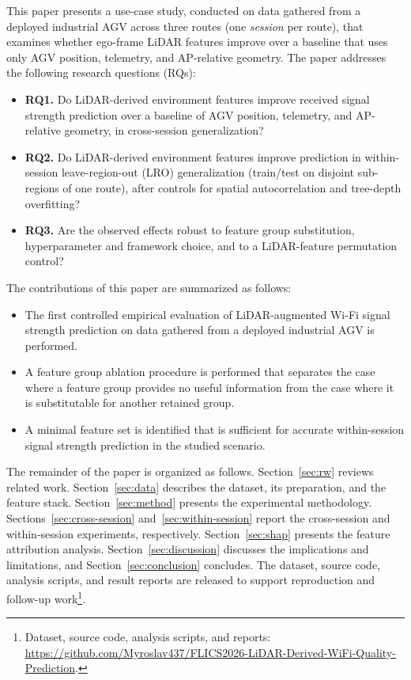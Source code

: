 \documentclass[conference]{IEEEtran}
\begin{document}
This paper presents a use-case study, conducted on data gathered from a deployed industrial AGV across three routes (one \emph{session} per route), that examines whether ego-frame LiDAR features improve over a baseline that uses only AGV position, telemetry, and AP-relative geometry. 
The paper addresses the following research questions (RQs):
\begin{itemize}
    \item \textbf{RQ1.} Do LiDAR-derived environment features improve received signal strength prediction over a baseline of AGV position, telemetry, and AP-relative geometry, in cross-session generalization?
    \item \textbf{RQ2.} Do LiDAR-derived environment features improve prediction in within-session leave-region-out (LRO) generalization (train/test on disjoint sub-regions of one route), after controls for spatial autocorrelation and tree-depth overfitting?
    \item \textbf{RQ3.} Are the observed effects robust to feature group substitution, hyperparameter and framework choice, and to a LiDAR-feature permutation control?
\end{itemize}
 
The contributions of this paper are summarized as follows:
\begin{itemize}
    \item The first controlled empirical evaluation of LiDAR-augmented Wi\nobreakdash-Fi signal strength prediction on data gathered from a deployed industrial AGV is performed.
    \item A feature group ablation procedure is performed that separates the case where a feature group provides no useful information from the case where it is substitutable for another retained group.
    \item A minimal feature set is identified that is sufficient for accurate within-session signal strength prediction in the studied scenario.
\end{itemize}
 
The remainder of the paper is organized as follows. Section~\ref{sec:rw} reviews related work. Section~\ref{sec:data} describes the dataset, its preparation, and the feature stack. Section~\ref{sec:method} presents the experimental methodology. Sections~\ref{sec:cross-session} and~\ref{sec:within-session} report the cross-session and within-session experiments, respectively. Section~\ref{sec:shap} presents the feature attribution analysis. Section~\ref{sec:discussion} discusses the implications and limitations, and Section~\ref{sec:conclusion} concludes.
The dataset, source code, analysis scripts, and result reports are released to support reproduction and follow-up work\footnote{Dataset, source code, analysis scripts, and reports: \url{https://github.com/Myroslav437/FLICS2026-LiDAR-Derived-WiFi-Quality-Prediction}.}.
\end{document}
